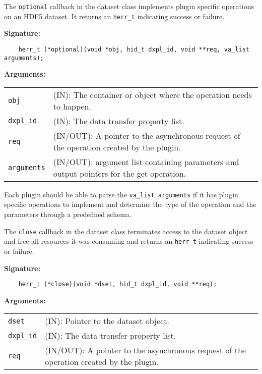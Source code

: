 The \texttt{optional} callback in the dataset class implements plugin specific operations on an HDF5 dataset. It returns an \texttt{herr\_t} indicating success or failure. \bigskip

\begin{mdframed}[style=bgbox]
\textbf{Signature:}
\begin{lstlisting}
    herr_t (*optional)(void *obj, hid_t dxpl_id, void **req, va_list arguments);
\end{lstlisting}

\textbf{Arguments:}\\
\begin{tabular}{l p{10cm}}
  \texttt{obj} & (IN): The container or object where the operation needs to happen.\\
  \texttt{dxpl\_id} & (IN): The data transfer property list.\\
  \texttt{req} & (IN/OUT): A pointer to the asynchronous request of the operation created by the plugin.\\
  \texttt{arguments} & (IN/OUT): argument list containing parameters and output pointers for the get operation. \\
\end{tabular}
\end{mdframed}

Each plugin should be able to parse the \texttt{va\_list arguments} if it has plugin specific operations to implement and determine the type of the operation and the parameters through a predefined schema. 

The \texttt{close} callback in the dataset class terminates access
to the dataset object and free all resources it was consuming and
returns an \texttt{herr\_t} indicating success or failure.\bigskip

\begin{mdframed}[style=bgbox]
\textbf{Signature:}
\begin{lstlisting}
    herr_t (*close)(void *dset, hid_t dxpl_id, void **req);
\end{lstlisting}

\textbf{Arguments:}\\
\begin{tabular}{l p{10cm}}
  \texttt{dset} & (IN): Pointer to the dataset object.\\
  \texttt{dxpl\_id} & (IN): The data transfer property list.\\
  \texttt{req} & (IN/OUT): A pointer to the asynchronous request of the
  operation created by the plugin.\\
\end{tabular}
\end{mdframed}

